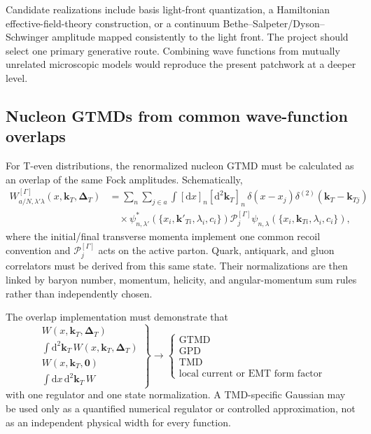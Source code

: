 \documentclass[11pt]{article}
\newcommand{\kT}{\bm{k}_{T}}
\newcommand{\DT}{\bm{\Delta}_{T}}
\newcommand{\dd}{\mathrm{d}}
\begin{document}
Candidate realizations include basis light-front quantization, a
Hamiltonian effective-field-theory construction, or a continuum
Bethe--Salpeter/Dyson--Schwinger amplitude mapped consistently to the light
front.  The project should select one primary generative route.  Combining
wave functions from mutually unrelated microscopic models would reproduce
the present patchwork at a deeper level.

\subsection{Nucleon GTMDs from common wave-function overlaps}

For T-even distributions, the renormalized nucleon GTMD must be calculated
as an overlap of the same Fock amplitudes.  Schematically,
\begin{align}
W_{a/N,\lambda'\lambda}^{[\Gamma]}
(x,\kT,\DT)
&=\sum_{n}\sum_{j\in a}
\int[\dd x]_n[\dd^2\bm k_T]_n\,
\delta(x-x_j)\delta^{(2)}(\kT-\bm k_{Tj})
\nonumber\\
&\quad\times
\psi_{n,\lambda'}^\ast(\{x_i,\bm k'_{Ti},\lambda_i,c_i\})
\mathcal P_{j}^{[\Gamma]}
\psi_{n,\lambda}(\{x_i,\bm k_{Ti},\lambda_i,c_i\}),
\label{eq:microscopic-overlap}
\end{align}
where the initial/final transverse momenta implement one common recoil
convention and \(\mathcal P_j^{[\Gamma]}\) acts on the active parton.
Quark, antiquark, and gluon correlators must be derived from this same
state.  Their normalizations are then linked by baryon number, momentum,
helicity, and angular-momentum sum rules rather than independently chosen.

The overlap implementation must demonstrate that
\begin{equation}
\left.
\begin{array}{c}
W(x,\kT,\DT)\\[1mm]
\displaystyle\int\dd^2\kT\,W(x,\kT,\DT)\\[1mm]
W(x,\kT,\bm0)\\[1mm]
\displaystyle\int\dd x\,\dd^2\kT\,W
\end{array}
\right\}
\longrightarrow
\left\{
\begin{array}{c}
\text{GTMD}\\
\text{GPD}\\
\text{TMD}\\
\text{local current or EMT form factor}
\end{array}
\right.
\label{eq:microscopic-reductions}
\end{equation}
with one regulator and one state normalization.  A TMD-specific Gaussian
may be used only as a quantified numerical regulator or controlled
approximation, not as an independent physical width for every function.
\end{document}
